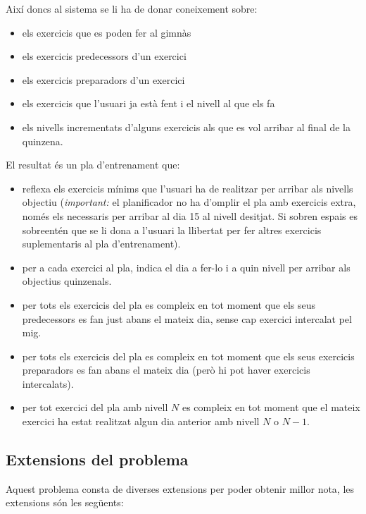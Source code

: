 \documentclass[a4paper,12pt, UTF-8]{article}
\begin{document}
Així doncs al sistema se li ha de donar coneixement sobre:

\begin{itemize}
	\item els exercicis que es poden fer al gimnàs
	\item els exercicis predecessors d'un exercici
	\item els exercicis preparadors d'un exercici
	\item els exercicis que l'usuari ja està fent i el nivell al que els fa
	\item els nivells incrementats d'alguns exercicis als que es vol arribar al final de la quinzena.
\end{itemize}

El resultat és un pla d'entrenament que:
\begin{itemize}
	\item reflexa els exercicis mínims que l'usuari ha de realitzar per arribar als nivells objectiu (\emph{important:} el planificador no ha d'omplir el pla amb exercicis extra, només els necessaris per arribar al dia 15 al nivell desitjat. Si sobren espais es sobreentén que se li dona a l'usuari la llibertat per fer altres exercicis suplementaris al pla d'entrenament).
	\item per a cada exercici al pla, indica el dia a fer-lo i a quin nivell per arribar als objectius quinzenals.
	\item per tots els exercicis del pla es compleix en tot moment que els seus predecessors es fan just abans el mateix dia, sense cap exercici intercalat pel mig. 
	\item per tots els exercicis del pla es compleix en tot moment que els seus exercicis preparadors es fan abans el mateix dia (però hi pot haver exercicis intercalats).
	\item per tot exercici del pla amb nivell $N$ es compleix en tot moment que el mateix exercici ha estat realitzat algun dia anterior amb nivell $N$ o $N - 1$.
\end{itemize}

\subsection{Extensions del problema}

Aquest problema consta de diverses extensions per poder obtenir millor nota, les extensions són les següents:
\end{document}
